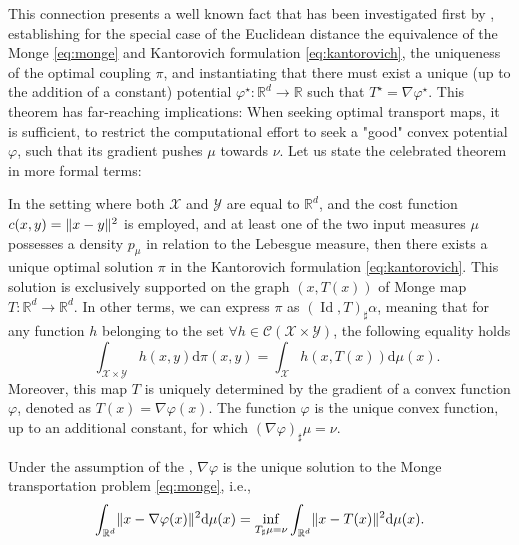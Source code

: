 This connection presents a well known fact that has been investigated first by \citeauthor{brenier1987decomposition}, establishing for the special case of the Euclidean distance the equivalence of the Monge \eqref{eq:monge} and Kantorovich formulation  \eqref{eq:kantorovich}, the uniqueness of the optimal coupling $\pi$, and instantiating that there must exist a unique (up to the addition of a constant) potential $\varphi^\star:\mathbb{R}^d\rightarrow \mathbb{R}$ such that $T^\star = \nabla \varphi^\star$. 
This theorem has far-reaching implications: When seeking optimal transport maps, it is sufficient, to restrict the computational effort to seek a "good" convex potential $\varphi$, such that its gradient pushes $\mu$ towards $\nu$. 
Let us state the celebrated \citeauthor{brenier1987decomposition} theorem \citeyearpar{brenier1987decomposition} in more formal terms:
\begin{theorem} \label{thm:brenier}
	In the setting where both $\mathcal{X}$ and $\mathcal{Y}$ are equal to $\mathbb{R}^d$, and the cost function $c(x, y) = \lVert x-y\rVert^2$ is employed, and at least one of the two input measures $\mu$ possesses a density $p_\mu$ in relation to the Lebesgue measure, then there exists a unique optimal solution $\pi$ in the Kantorovich formulation \eqref{eq:kantorovich}.
	This solution is exclusively supported on the graph $(x, T(x))$ of Monge map $T: \mathbb{R}^d \rightarrow \mathbb{R}^d$.
	In other terms, we can express $\pi$ as $(\operatorname{Id}, T)_{\sharp} \alpha$, meaning that for any function $h$ belonging to the set $\forall h \in \mathcal{C}(\mathcal{X} \times \mathcal{Y})$, the following equality holds
	$$
	\quad \int_{\mathcal{X} \times \mathcal{Y}} h(x, y) \mathrm{d} \pi(x, y)=\int_{\mathcal{X}} h(x, T(x)) \mathrm{d} \mu(x).
	$$
Moreover, this map $T$ is uniquely determined by the gradient of a convex function $\varphi$, denoted as $T(x)=\nabla \varphi(x)$. The function $\varphi$ is the unique convex function, up to an additional constant, for which $(\nabla \varphi)_{\sharp} \mu=\nu$.
\end{theorem}
\begin{corollary}
	Under the assumption of the , $\nabla \varphi$ is the unique solution to the Monge transportation problem \eqref{eq:monge}, i.e.,
	\begin{equation}
		\int_{\mathbb{R}^d} \lVert x-\nabla \varphi(x)\rVert^2 \mathrm{d}\mu(x) = \inf_{T_\sharp \mu = \nu} \int_{\mathbb{R}^d}\lVert x - T(x)\rVert^2 \mathrm{d}\mu(x).
	\end{equation}
\end{corollary}

